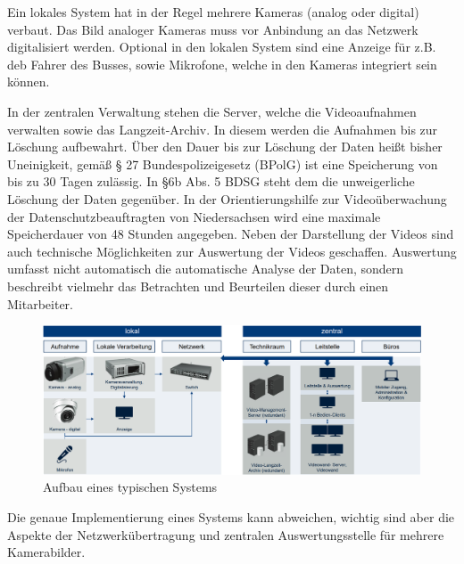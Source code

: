 Ein lokales System hat in der Regel mehrere Kameras (analog oder digital) verbaut. Das Bild analoger Kameras muss vor Anbindung an das Netzwerk digitalisiert werden.
Optional in den lokalen System sind eine Anzeige für z.B. deb Fahrer des Busses, sowie Mikrofone, welche in den Kameras integriert sein können.

In der zentralen Verwaltung stehen die Server, welche die Videoaufnahmen verwalten sowie das \glqq{}Langzeit-Archiv\grqq{}. In diesem werden die Aufnahmen bis zur Löschung aufbewahrt.
Über den Dauer bis zur Löschung der Daten heißt bisher Uneinigkeit, gemäß § 27 Bundespolizeigesetz (BPolG) ist eine Speicherung von bis zu 30 Tagen zulässig. In  §6b Abs. 5 BDSG
steht dem die unweigerliche Löschung der Daten gegenüber. In der \glqq{}Orientierungshilfe zur Videoüberwachung\grqq{} der Datenschutzbeauftragten von Niedersachsen wird eine maximale
Speicherdauer von 48 Stunden angegeben\cite{DanielaWindelband.20.April2016}. Neben der Darstellung der Videos sind auch technische Möglichkeiten zur Auswertung der Videos geschaffen.
Auswertung umfasst nicht automatisch die automatische Analyse der Daten, sondern beschreibt vielmehr das Betrachten und Beurteilen dieser durch einen Mitarbeiter.

\begin{figure}[ht]
    \begin{center}
        \includegraphics[width= 1\textwidth]{Bilder/architektur.png}
        \caption{Aufbau eines typischen Systems \cite{LandesbeauftragtefurdenDatenschutzBadenWurttemberg.2015}}
        \label{fig:architektur}
    \end{center}
\end{figure}
Die genaue Implementierung eines Systems kann abweichen, wichtig sind aber die Aspekte der Netzwerkübertragung und zentralen Auswertungsstelle für mehrere Kamerabilder.
